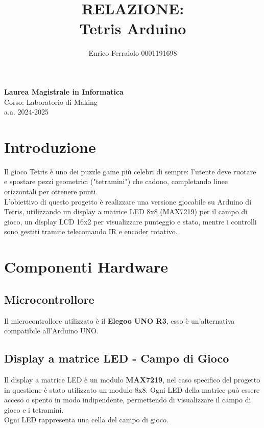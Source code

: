 \documentclass[a4paper, 12pt]{article}
\title{\textbf{RELAZIONE: \\ Tetris Arduino}}
\author{Enrico Ferraiolo 0001191698}
\date{}
\begin{document}
\maketitle

\begin{center}
    \textbf{Laurea Magistrale in Informatica}\\
    \vspace{0.3cm}
    Corso: Laboratorio di Making\\
    a.a. 2024-2025
    \vspace{2cm}
\end{center}

\newpage

\tableofcontents
\newpage

\section{Introduzione}
Il gioco Tetris è uno dei puzzle game più celebri di sempre: l'utente deve ruotare e spostare pezzi geometrici ("tetramini") che cadono, 
completando linee orizzontali per ottenere punti.\\
L'obiettivo di questo progetto è realizzare una versione giocabile su Arduino di Tetris, utilizzando un display a matrice LED 8x8 (MAX7219) 
per il campo di gioco, un display LCD 16x2 per visualizzare punteggio e stato, mentre i controlli sono gestiti tramite telecomando IR e encoder rotativo.\\
\newpage

\section{Componenti Hardware}
\subsection{Microcontrollore}
Il microcontrollore utilizzato è il \textbf{Elegoo UNO R3}, esso è un'alternativa compatibile all'Arduino UNO.

\subsection{Display a matrice LED - Campo di Gioco}
Il display a matrice LED è un modulo \textbf{MAX7219}, nel caso specifico del progetto in questione è stato utilizzato un modulo 8x8.
Ogni LED della matrice può essere acceso o spento in modo indipendente, permettendo di visualizzare il campo di gioco e i tetramini.\\
Ogni LED rappresenta una cella del campo di gioco.
\end{document}

